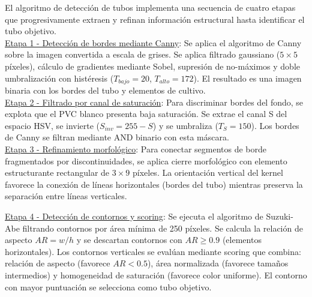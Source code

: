 El algoritmo de detección de tubos implementa una secuencia de cuatro etapas que progresivamente extraen y refinan información estructural hasta identificar el tubo objetivo.\\

\underline{Etapa 1 - Detección de bordes mediante Canny}: Se aplica el algoritmo de Canny sobre la imagen convertida a escala de grises. Se aplica filtrado gaussiano ($5 \times 5$ píxeles), cálculo de gradientes mediante Sobel, supresión de no-máximos y doble umbralización con histéresis ($T_{bajo} = 20$, $T_{alto} = 172$). El resultado es una imagen binaria con los bordes del tubo y elementos de cultivo.\\

\underline{Etapa 2 - Filtrado por canal de saturación}: Para discriminar bordes del fondo, se explota que el PVC blanco presenta baja saturación. Se extrae el canal S del espacio HSV, se invierte ($S_{inv} = 255 - S$) y se umbraliza ($T_S = 150$). Los bordes de Canny se filtran mediante AND binario con esta máscara.\\

\underline{Etapa 3 - Refinamiento morfológico}: Para conectar segmentos de borde fragmentados por discontinuidades, se aplica cierre morfológico con elemento estructurante rectangular de $3 \times 9$ píxeles. La orientación vertical del kernel favorece la conexión de líneas horizontales (bordes del tubo) mientras preserva la separación entre líneas verticales.


\underline{Etapa 4 - Detección de contornos y scoring}: Se ejecuta el algoritmo de Suzuki-Abe filtrando contornos por área mínima de 250 píxeles. Se calcula la relación de aspecto $AR = w/h$ y se descartan contornos con $AR \geq 0.9$ (elementos horizontales). Los contornos verticales se evalúan mediante scoring que combina: relación de aspecto (favorece $AR < 0.5$), área normalizada (favorece tamaños intermedios) y homogeneidad de saturación (favorece color uniforme). El contorno con mayor puntuación se selecciona como tubo objetivo.

